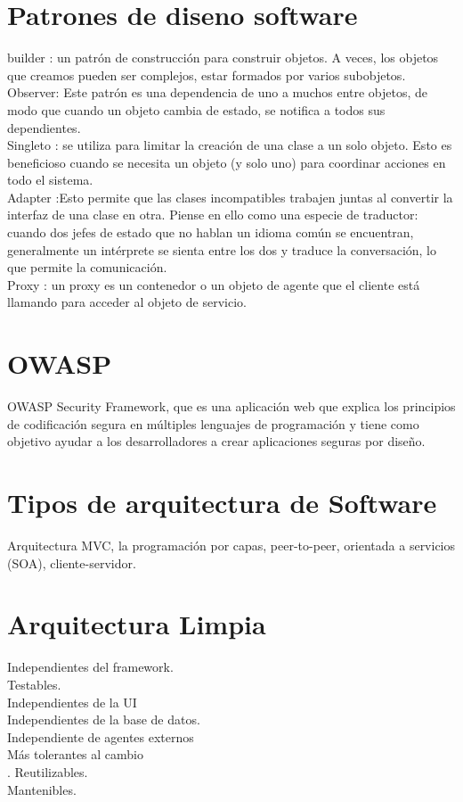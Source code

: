  \section{Patrones de diseno software}
 builder :  un patr\'on de construcci\'on para construir objetos. A veces, los objetos que creamos pueden ser complejos, estar formados por varios subobjetos.\\
 Observer: Este patr\'on es una dependencia de uno a muchos entre objetos, de modo que cuando un objeto cambia de estado, se notifica a todos sus dependientes.\\
 Singleto : se utiliza para limitar la creaci\'on de una clase a un solo objeto. Esto es beneficioso cuando se necesita un objeto (y solo uno) para coordinar acciones en todo el sistema. \\
 Adapter :Esto permite que las clases incompatibles trabajen juntas al convertir la interfaz de una clase en otra. Piense en ello como una especie de traductor: cuando dos jefes de estado que no hablan un idioma com\'un se encuentran, generalmente un intérprete se sienta entre los dos y traduce la conversaci\'on, lo que permite la comunicaci\'on.\\
 Proxy :  un proxy es un contenedor o un objeto de agente que el cliente est\'a llamando para acceder al objeto de
  servicio.
 \section{OWASP}
 OWASP Security Framework, que es una aplicaci\'on web que explica los principios de codificaci\'on segura en m\'ultiples lenguajes de programaci\'on y tiene como objetivo ayudar a los desarrolladores a crear aplicaciones seguras por dise\~no.
 \section{Tipos de arquitectura de Software}
  Arquitectura  MVC, la programaci\'on por capas, peer-to-peer, orientada a servicios (SOA), cliente-servidor.
  \section{Arquitectura Limpia}
  Independientes del framework.\\
  Testables.\\
  Independientes de la UI\\
  Independientes de la base de datos.\\
  Independiente de agentes externos\\
  Más tolerantes al cambio\\.
  Reutilizables.\\
  Mantenibles.
